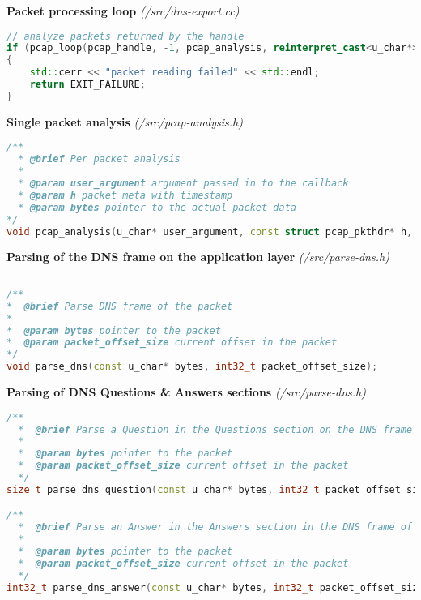 \vspace{1cm}
\textbf{Packet processing loop} \textit{(/src/dns-export.cc)}
\begin{lstlisting}[language=C++] 
// analyze packets returned by the handle
if (pcap_loop(pcap_handle, -1, pcap_analysis, reinterpret_cast<u_char*>(&link_type)) != 0)
{
    std::cerr << "packet reading failed" << std::endl;
    return EXIT_FAILURE;
}
\end{lstlisting}

\pagebreak

\vspace{1cm}
\textbf{Single packet analysis} \textit{(/src/pcap-analysis.h)}
\begin{lstlisting}[language=C++] 
/**
  * @brief Per packet analysis
  * 
  * @param user_argument argument passed in to the callback
  * @param h packet meta with timestamp
  * @param bytes pointer to the actual packet data
*/
void pcap_analysis(u_char* user_argument, const struct pcap_pkthdr* h, const u_char* bytes);

\end{lstlisting}


\vspace{1cm}
\textbf{Parsing of the DNS frame on the application layer} \textit{(/src/parse-dns.h)}
\begin{lstlisting}[language=C++] 
   
/**
*  @brief Parse DNS frame of the packet
* 
*  @param bytes pointer to the packet
*  @param packet_offset_size current offset in the packet
*/
void parse_dns(const u_char* bytes, int32_t packet_offset_size);

\end{lstlisting}

\vspace{1cm}
\textbf{Parsing of DNS Questions \& Answers sections} \textit{(/src/parse-dns.h)}
\begin{lstlisting}[language=C++] 
/**
  *  @brief Parse a Question in the Questions section on the DNS frame of the packet
  * 
  *  @param bytes pointer to the packet
  *  @param packet_offset_size current offset in the packet
  */
size_t parse_dns_question(const u_char* bytes, int32_t packet_offset_size);

/**
  *  @brief Parse an Answer in the Answers section in the DNS frame of the packet
  * 
  *  @param bytes pointer to the packet
  *  @param packet_offset_size current offset in the packet
  */
int32_t parse_dns_answer(const u_char* bytes, int32_t packet_offset_size);
\end{lstlisting}

